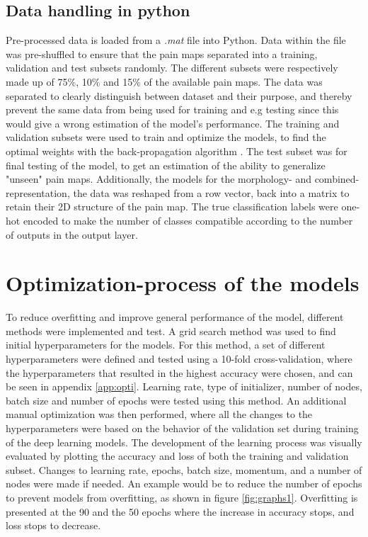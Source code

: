 \subsection{Data handling in python}
Pre-processed data is loaded from a \textit{.mat} file into Python.
Data within the file was pre-shuffled to ensure that the pain maps separated into a training, validation and test subsets randomly. The different subsets were respectively made up of 75\%, 10\% and 15\% of the available pain maps. The data was separated to clearly distinguish between dataset and their purpose, and thereby prevent the same data from being used for training and e.g testing since this would give a wrong estimation of the model’s performance.
The training and validation subsets were used to train and optimize the models, to find the optimal weights with the back-propagation algorithm \citep{Bengio2012}.
The test subset was for final testing of the model, to get an estimation of the ability to generalize "unseen" pain maps.
Additionally, the models for the morphology- and combined-representation, the data was reshaped from a row vector, back into a matrix to retain their 2D structure of the pain map.
The true classification labels were one-hot encoded to make the number of classes compatible according to the number of outputs in the output layer.

\section{Optimization-process of the models}
To reduce overfitting and improve general performance of the model, different methods were implemented and test.
A grid search method was used to find initial hyperparameters for the models. For this method, a set of different hyperparameters were defined and tested using a 10-fold cross-validation, where the hyperparameters that resulted in the highest accuracy were chosen, and can be seen in appendix \ref{app:opti}. Learning rate, type of initializer, number of nodes, batch size and number of epochs were tested using this method. 
An additional manual optimization was then performed, where all the changes to the hyperparameters were based on the behavior of the validation set during training of the deep learning models.
The development of the learning process was visually evaluated by plotting the accuracy and loss of both the training and validation subset. 
Changes to learning rate, epochs, batch size, momentum, and a number of nodes were made if needed. 
An example would be to reduce the number of epochs to prevent models from overfitting, as shown in figure \ref{fig:graphs1}. Overfitting is presented at the 90 and the 50 epochs where the increase in accuracy stops, and loss stops to decrease. 

